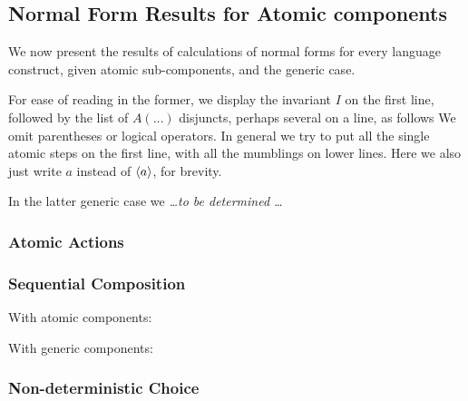 \subsection{Normal Form Results for Atomic components}

We now present the results of calculations of normal forms for every language
construct, given atomic sub-components,
and the generic case.

For ease of reading in the former,
we display the invariant $I$ on the first line,
followed by the list of $A(\dots)$ disjuncts, perhaps several on a line,
as follows
We omit parentheses or logical operators.
In general we try to put all the single atomic steps on the first line,
with all the mumblings on lower lines.
Here we also just write $a$ instead of $\langle a\rangle$,
for brevity.

In the latter generic case we  \emph{\dots to be determined \dots}

\subsubsection{Atomic Actions}

\subsubsection{Sequential Composition}

With atomic components:

With generic components:


\subsubsection{Non-deterministic Choice}


